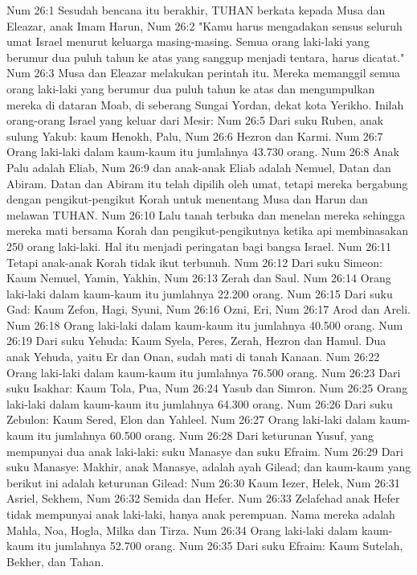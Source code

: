 Num 26:1  Sesudah bencana itu berakhir, TUHAN berkata kepada Musa dan Eleazar, anak Imam Harun,
Num 26:2  "Kamu harus mengadakan sensus seluruh umat Israel menurut keluarga masing-masing. Semua orang laki-laki yang berumur dua puluh tahun ke atas yang sanggup menjadi tentara, harus dicatat."
Num 26:3  Musa dan Eleazar melakukan perintah itu. Mereka memanggil semua orang laki-laki yang berumur dua puluh tahun ke atas dan mengumpulkan mereka di dataran Moab, di seberang Sungai Yordan, dekat kota Yerikho. Inilah orang-orang Israel yang keluar dari Mesir:
Num 26:5  Dari suku Ruben, anak sulung Yakub: kaum Henokh, Palu,
Num 26:6  Hezron dan Karmi.
Num 26:7  Orang laki-laki dalam kaum-kaum itu jumlahnya 43.730 orang.
Num 26:8  Anak Palu adalah Eliab,
Num 26:9  dan anak-anak Eliab adalah Nemuel, Datan dan Abiram. Datan dan Abiram itu telah dipilih oleh umat, tetapi mereka bergabung dengan pengikut-pengikut Korah untuk menentang Musa dan Harun dan melawan TUHAN.
Num 26:10  Lalu tanah terbuka dan menelan mereka sehingga mereka mati bersama Korah dan pengikut-pengikutnya ketika api membinasakan 250 orang laki-laki. Hal itu menjadi peringatan bagi bangsa Israel.
Num 26:11  Tetapi anak-anak Korah tidak ikut terbunuh.
Num 26:12  Dari suku Simeon: Kaum Nemuel, Yamin, Yakhin,
Num 26:13  Zerah dan Saul.
Num 26:14  Orang laki-laki dalam kaum-kaum itu jumlahnya 22.200 orang.
Num 26:15  Dari suku Gad: Kaum Zefon, Hagi, Syuni,
Num 26:16  Ozni, Eri,
Num 26:17  Arod dan Areli.
Num 26:18  Orang laki-laki dalam kaum-kaum itu jumlahnya 40.500 orang.
Num 26:19  Dari suku Yehuda: Kaum Syela, Peres, Zerah, Hezron dan Hamul. Dua anak Yehuda, yaitu Er dan Onan, sudah mati di tanah Kanaan.
Num 26:22  Orang laki-laki dalam kaum-kaum itu jumlahnya 76.500 orang.
Num 26:23  Dari suku Isakhar: Kaum Tola, Pua,
Num 26:24  Yasub dan Simron.
Num 26:25  Orang laki-laki dalam kaum-kaum itu jumlahnya 64.300 orang.
Num 26:26  Dari suku Zebulon: Kaum Sered, Elon dan Yahleel.
Num 26:27  Orang laki-laki dalam kaum-kaum itu jumlahnya 60.500 orang.
Num 26:28  Dari keturunan Yusuf, yang mempunyai dua anak laki-laki: suku Manasye dan suku Efraim.
Num 26:29  Dari suku Manasye: Makhir, anak Manasye, adalah ayah Gilead; dan kaum-kaum yang berikut ini adalah keturunan Gilead:
Num 26:30  Kaum Iezer, Helek,
Num 26:31  Asriel, Sekhem,
Num 26:32  Semida dan Hefer.
Num 26:33  Zelafehad anak Hefer tidak mempunyai anak laki-laki, hanya anak perempuan. Nama mereka adalah Mahla, Noa, Hogla, Milka dan Tirza.
Num 26:34  Orang laki-laki dalam kaum-kaum itu jumlahnya 52.700 orang.
Num 26:35  Dari suku Efraim: Kaum Sutelah, Bekher, dan Tahan.
